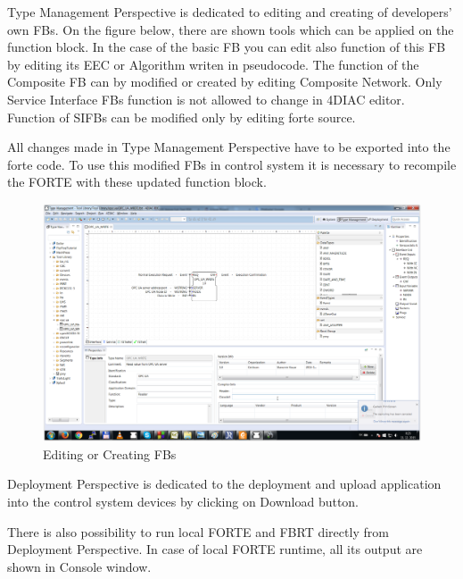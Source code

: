 Type Management Perspective is dedicated to editing and creating of developers' own FBs. 
On the figure below, there are shown tools which can be applied on the function block.
In the case of the basic FB you can edit also function of this FB by editing its EEC or Algorithm writen in pseudocode. 
The function of the Composite FB can by modified or created by editing Composite Network. Only Service Interface FBs function is not allowed to change in 4DIAC editor. Function of SIFBs can be modified only by editing forte source. 

All changes made in Type Management Perspective have to be exported into the forte code. To use this modified FBs in control system it is necessary to recompile the FORTE with these updated function block.


\begin{figure}[hbp]
\centering
\includegraphics[scale=0.3]{Figures/typemanagementperspective}
\decoRule
\caption[4DIAC IDE Type Management Perspective ]{Editing or Creating FBs}
\label{4DIAC IDE Type Management Perspective}
\end{figure}


Deployment Perspective is dedicated to the deployment and upload application into the control system devices by clicking on Download button.

There is also possibility to run local FORTE and FBRT directly from Deployment Perspective. In case of local FORTE runtime, all its output are shown in Console window. 


